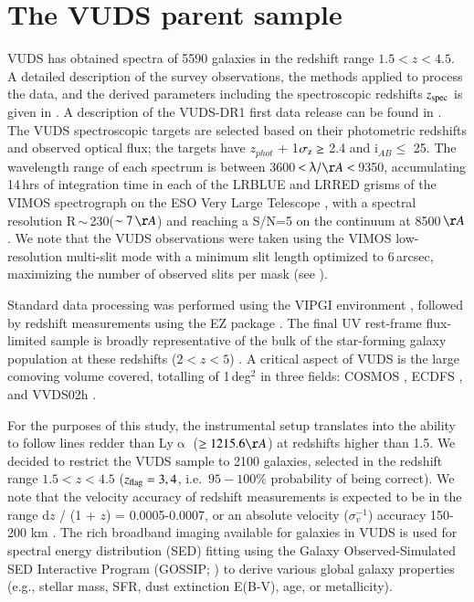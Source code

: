 \documentclass[longauth]{aa}
\begin{document}
\section{The VUDS parent sample}\label{sec:Data}

VUDS has obtained spectra of 5590 galaxies in the redshift range $1.5 < z <
4.5$. A detailed description  of the survey observations,
the methods applied to process the data, and the derived parameters including
the spectroscopic redshifts $z_{\rm{spec}}$ is given in \cite{LeFevre15}. A
description of the VUDS-DR1 first data release can be found in \cite
{Tasca17}. The VUDS spectroscopic targets are selected based on their
photometric  redshifts and observed optical flux; the targets have $z_
{phot}$ + 1$\sigma_{\rm z} \geq$ 2.4 and  i$_{AB} \leq$ 25. The  wavelength
range of each spectrum is between 3600\,$<\uplambda/\AA<$\,9350, accumulating
14\,hrs of integration time in each of the LRBLUE and LRRED grisms of the
VIMOS spectrograph on the ESO Very Large Telescope \citep{LeFevre03}, with a
spectral resolution R\,$\sim$\,230($\sim 7\,\AA$) and reaching a S/N=5 on the
continuum at 8500\,$\AA$. We note that the VUDS observations were taken using
the VIMOS low-resolution multi-slit mode with a minimum slit length optimized
to 6\,arcsec, maximizing the number of observed slits per mask (see \citealt
{Bottini05}).

Standard data processing was performed using the VIPGI environment  
\citep{Scodeggio05}, followed by redshift measurements using the {\sc EZ}
package \citep{Garilli10}. The final UV rest-frame flux-limited sample is
broadly representative of the bulk of the star-forming galaxy population at
these redshifts ($2 < z < 5$) \citep{Lemaux22}. A critical aspect of VUDS is
the large comoving volume covered, totalling of  1\,deg$^{2}$ in three
fields: COSMOS \citep{Scoville07}, ECDFS \citep{Giacconi02}, and
VVDS02h \citep{LeFevre05b,LeFevre13b}.

For the purposes of this study, the instrumental setup translates into the
ability to follow lines redder than Ly$\upalpha$ ($\geq1215.6\AA$)  at
redshifts higher than 1.5. We decided to restrict the VUDS sample to 2100
galaxies, selected in the redshift range $1.5 < z < 4.5$ ($z_{\rm
{flag}}=3, 4$, i.e.\ $95-100\%$ probability  of being correct). We note that
the velocity accuracy of redshift measurements is expected to be in the range
d$z$ / (1 + $z$) = 0.0005-0.0007, or an absolute velocity ($\sigma^{-1}_
{v}$) accuracy 150-200 km  \citep{LeFevre13b,LeFevre15,Tasca17}. The rich
broadband imaging available for galaxies in VUDS is used for spectral energy
distribution (SED) fitting \citep{Tasca15,Thomas17} using the Galaxy
Observed-Simulated SED Interactive Program ({\sc GOSSIP};
\citealt{Franzetti08}) to derive various global galaxy properties
(e.g., stellar mass, SFR, dust extinction E(B-V), age, or metallicity).
\end{document}
